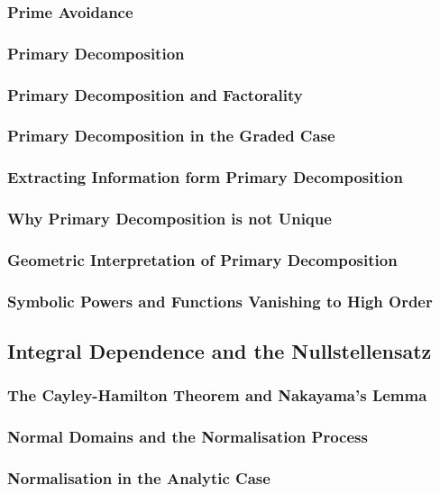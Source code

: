 \subsubsection{Prime Avoidance}
\subsubsection{Primary Decomposition}
\subsubsection{Primary Decomposition and Factorality}
\subsubsection{Primary Decomposition in the Graded Case}
\subsubsection{Extracting Information form Primary Decomposition}
\subsubsection{Why Primary Decomposition is not Unique}
\subsubsection{Geometric Interpretation of Primary Decomposition}
\subsubsection{Symbolic Powers and Functions Vanishing to High Order}

\subsection{Integral Dependence and the Nullstellensatz}
\subsubsection{The Cayley-Hamilton Theorem and Nakayama's Lemma}
\subsubsection{Normal Domains and the Normalisation Process}
\subsubsection{Normalisation in the Analytic Case}
